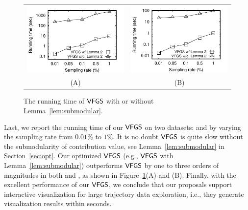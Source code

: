 \begin{figure}
 \centering
 \small
 \begin{tabular}{cc}
   \includegraphics[width=0.44\columnwidth]{pictures/tporto}
   &
   \includegraphics[width=0.44\columnwidth]{pictures/tshenzhen}
   \\
   (A) \pt{}
   &
   (B) \sz{}	
 \end{tabular}
 \vspace{-3mm}
 \caption{The running time of $\mathsf{VFGS}$ with or without Lemma~\ref{lem:submodular}.}
 \label{fig:cost}
 \vspace{-4mm}
\end{figure}


Last, we report the running time of our $\mathsf{VFGS}$ on two datasets: \pt{} and \sz{} by varying the sampling rate from $0.01\%$ to $1\%$.
It is no doubt $\mathsf{VFGS}$ is quite slow without the submodularity of contribution value, see Lemma~\ref{lem:submodular} in Section~\ref{sec:opt}.
Our optimized $\mathsf{VFGS}$ (e.g., $\mathsf{VFGS}$ with Lemma~\ref{lem:submodular}) outperforms $\mathsf{VFGS}$ by one to three orders of magnitudes in both \pt{} and \sz{}, as shown in Figure~\ref{fig:cost}(A) and (B).
Finally, with the excellent performance of our $\mathsf{VFGS}$, we conclude that our proposals support interactive visualization for large trajectory data exploration, i.e., they generate visualization results within seconds.

